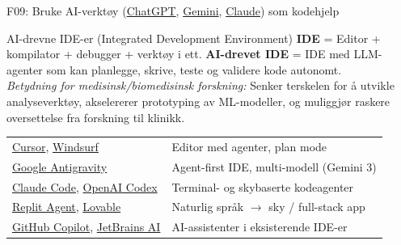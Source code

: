 \documentclass[aspectratio=169, 10pt]{beamer}
\begin{document}
\begin{frame}{F09: Bruke AI-verktøy (\href{https://chat.openai.com/}{ChatGPT}, \href{https://gemini.google.com/}{Gemini}, \href{https://claude.ai/}{Claude}) som kodehjelp}
    \vspace{0.1cm}
    \begin{block}{\footnotesize AI-drevne IDE-er (Integrated Development Environment)}
        \scriptsize
        \textbf{IDE} = Editor + kompilator + debugger + verktøy i ett.
        \textbf{AI-drevet IDE} = IDE med LLM-agenter som kan planlegge, skrive, teste og validere kode autonomt.\\
        \textit{Betydning for medisinsk/biomedisinsk forskning:} Senker terskelen for å utvikle analyseverktøy, akselererer prototyping av ML-modeller, og muliggjør raskere oversettelse fra forskning til klinikk.\\[3pt]
        \begin{tabular}{@{}ll@{}}
        \href{https://www.cursor.com/}{Cursor}, \href{https://windsurf.com/}{Windsurf} & Editor med agenter, plan mode \\
        \href{https://antigravity.google}{Google Antigravity} & Agent-first IDE, multi-modell (Gemini 3) \\
        \href{https://claude.ai/code}{Claude Code}, \href{https://openai.com/codex/}{OpenAI Codex} & Terminal- og skybaserte kodeagenter \\
        \href{https://replit.com/}{Replit Agent}, \href{https://lovable.dev/}{Lovable} & Naturlig språk $\rightarrow$ sky / full-stack app \\
        \href{https://github.com/features/copilot}{GitHub Copilot}, \href{https://www.jetbrains.com/ai/}{JetBrains AI} & AI-assistenter i eksisterende IDE-er
        \end{tabular}
    \end{block}
\end{frame}
\end{document}
